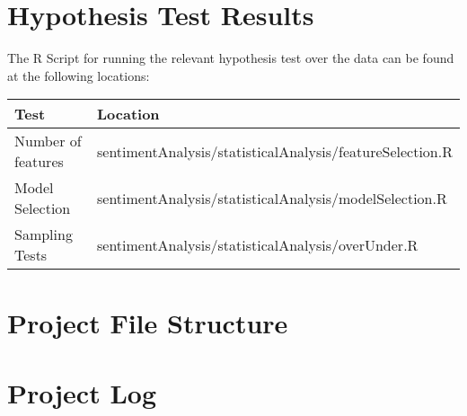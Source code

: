 
\begin{appendices}

\section{Hypothesis Test Results}
\label{appendix:hypothesis}
The R Script for running the relevant hypothesis test over the data can be found at the following locations:
\begin{center}

\begin{tabular}{|l|l|}
\hline
 Test &  Location\\ \hline
 Number of features &  sentimentAnalysis/statisticalAnalysis/featureSelection.R\\
 Model Selection &  sentimentAnalysis/statisticalAnalysis/modelSelection.R\\
 Sampling Tests &  sentimentAnalysis/statisticalAnalysis/overUnder.R\\ \hline
\end{tabular}
\end{center}

\section{Project File Structure}

\section{Project Log}

\end{appendices}
